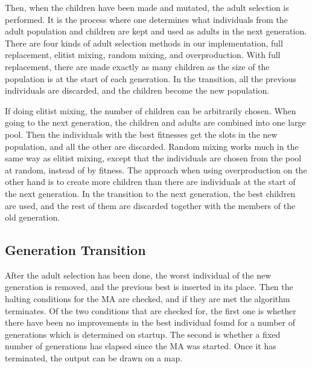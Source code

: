 Then, when the children have been made and mutated, the adult selection is performed. It is the process where one determines what individuals from the adult population and children are kept and used as adults in the next generation. There are four kinds of adult selection methods in our implementation, full replacement, elitist mixing, random mixing, and overproduction. With full replacement, there are made exactly as many children as the size of the population is at the start of each generation. In the transition, all the previous individuals are discarded, and the children become the new population.

If doing elitist mixing, the number of children can be arbitrarily chosen. When going to the next generation, the children and adults are combined into one large pool. Then the individuals with the best fitnesses get the slots in the new population, and all the other are discarded. Random mixing works much in the same way as elitist mixing, except that the individuals are chosen from the pool at random, instead of by fitness. The approach when using overproduction on the other hand is to create more children than there are individuals at the start of the next generation. In the transition to the next generation, the best children are used, and the rest of them are discarded together with the members of the old generation.


\subsection{Generation Transition} %
\label{sub:achitecture_generation_transition}


After the adult selection has been done, the worst individual of the new generation is removed, and the previous best is inserted in its place. Then the halting conditions for the MA are checked, and if they are met the algorithm terminates. Of the two conditions that are checked for, the first one is whether there have been no improvements in the best individual found for a number of generations which is determined on startup. The second is whether a fixed number of generations has elapsed since the MA was started. Once it has terminated, the output can be drawn on a map.


\cleardoublepage
